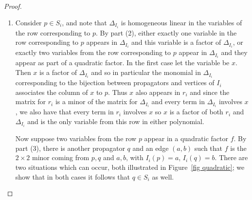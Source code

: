 \documentclass[11pt]{article}
\theoremstyle{remark}
\theoremstyle{definition}
\begin{document}
\begin{proof}
\begin{enumerate}
Now let $f$ be a quadratic factor of $\Delta_{I_i}$.  By part (2) we know that $f$ is a $2\times 2$ minor coming from two propagators, call them $p$ and $q$, and two vertices, call them $a <_i b$.  It remains to show that $a$ and $b$ are adjacent.  From this we can conclude that $p$ and $q$ each have one end on $(a,b)$, as any other way for both $p$ and $q$ to be supported on two consecutive vertices would contradict noncrossing or the density requirement of admissibility.

As in the proof of part (2), make a new admissible diagram by removing the propagators which come before $f$ and set $i=a$.  The cases in the proof of part (2) show how $\Delta_{I_i}$ factors: in particular the vertices supporting the other end of $p$ either do not appear in $I_i$, or they contribute to a different factor of $\Delta_{I_i}$ than $p$ and $a$ do.  By assumption $b$ contributes to the same factor as $a$.  Therefore $(a,b)$ is an edge.

\item Consider $p\in S_i$, and note that $\Delta_{I_i}$ is homogeneous linear in the variables of the row corresponding to $p$.  By part (2), either exactly one variable in the row corresponding to $p$ appears in $\Delta_{I_i}$ and this variable is a factor of $\Delta_{I_i}$, or exactly two variables from the row corresponding to $p$ appear in $\Delta_{I_i}$ and they appear as part of a quadratic factor.  In the first case let the variable be $x$. Then $x$ is a factor of $\Delta_{I_i}$ and so in particular the monomial in $\Delta_{I_i}$ corresponding to the bijection between propagators and vertices of $I_i$ associates the column of $x$ to $p$.  Thus $x$ also appears in $r_i$ and since the matrix for $r_i$ is a minor of the matrix for $\Delta_{I_i}$ and every term in $\Delta_{I_i}$ involves $x$, we also have that every term in $r_i$ involves $x$ so $x$ is a factor of both $r_i$ and $\Delta_{I_i}$ and is the only variable from this row in either polynomial.  

Now suppose two variables from the row $p$ appear in a quadratic factor $f$.  By part (3), there is another propagator $q$ and an edge $(a,b)$ such that $f$ is the $2\times 2$ minor coming from $p, q$ and $a, b$, with $I_i(p)=a$, $I_i(q)=b$.  There are two situations which can occur, both illustrated in Figure~\ref{fig quadratic}; we show that in both cases it follows that $q \in S_i$ as well.


\end{enumerate}
\end{proof}
\end{document}
